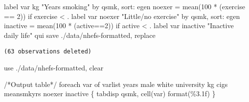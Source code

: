 \documentclass[
  10pt,
  a4paper,
]{book}
\newenvironment{Shaded}{\begin{snugshade}}{\end{snugshade}}
\newcommand{\BaseNTok}[1]{\textcolor[rgb]{0.68,0.00,0.00}{#1}}
\newcommand{\CommentTok}[1]{\textcolor[rgb]{0.37,0.37,0.37}{#1}}
\newcommand{\KeywordTok}[1]{\textcolor[rgb]{0.00,0.46,0.62}{#1}}
\newcommand{\NormalTok}[1]{\textcolor[rgb]{0.00,0.46,0.62}{#1}}
\newcommand{\OtherTok}[1]{\textcolor[rgb]{0.00,0.46,0.62}{#1}}
\newcommand{\StringTok}[1]{\textcolor[rgb]{0.13,0.47,0.30}{#1}}
\begin{document}
\begin{Shaded}
\begin{Highlighting}[]
\KeywordTok{label} \KeywordTok{var}\NormalTok{ kg }\StringTok{"Years smoking"}
\KeywordTok{by}\NormalTok{ qsmk, }\KeywordTok{sort}\NormalTok{: }\KeywordTok{egen}\NormalTok{ noexer = }\KeywordTok{mean}\NormalTok{(100 * (exercise == 2)) }\KeywordTok{if}\NormalTok{ exercise \textless{} . }
\KeywordTok{label} \KeywordTok{var}\NormalTok{ noexer }\StringTok{"Little/no exercise"}
\KeywordTok{by}\NormalTok{ qsmk, }\KeywordTok{sort}\NormalTok{: }\KeywordTok{egen}\NormalTok{ inactive = }\KeywordTok{mean}\NormalTok{(100 * (active==2)) }\KeywordTok{if}\NormalTok{ active \textless{} . }
\KeywordTok{label} \KeywordTok{var}\NormalTok{ inactive }\StringTok{"Inactive daily life"}
\KeywordTok{qui} \KeywordTok{save}\NormalTok{ ./}\KeywordTok{data}\NormalTok{/nhefs{-}formatted, }\KeywordTok{replace}
\end{Highlighting}
\end{Shaded}

\begin{verbatim}
(63 observations deleted)
\end{verbatim}

\begin{Shaded}
\begin{Highlighting}[]
\KeywordTok{use}\NormalTok{ ./}\KeywordTok{data}\NormalTok{/nhefs{-}formatted, }\KeywordTok{clear}

\CommentTok{/*Output table*/}
\KeywordTok{foreach} \KeywordTok{var} \KeywordTok{of} \KeywordTok{varlist}\NormalTok{ years male  }\BaseNTok{white}\NormalTok{ university kg cigs meansmkyrs noexer inactive \{}
\NormalTok{  tabdisp qsmk, cell(}\OtherTok{\textasciigrave{}var\textquotesingle{}}\NormalTok{) }\KeywordTok{format}\NormalTok{(\%3.1f)}
\NormalTok{\}}
\end{Highlighting}
\end{Shaded}
\end{document}
